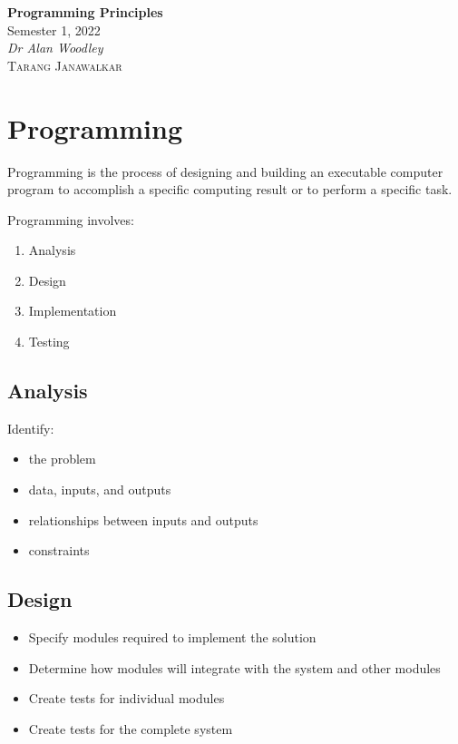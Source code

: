 \documentclass{article}
\date{}
\newcommand{\unitName}{Programming Principles}
\newcommand{\unitTime}{Semester 1, 2022}
\newcommand{\unitCoordinator}{Dr Alan Woodley}
\newcommand{\documentAuthors}{\textsc{Tarang Janawalkar}}
\begin{document}
%
\begin{titlepage}
    \vspace*{\fill}
    \begin{center}
        \LARGE{\textbf{\unitName}} \\[0.1in]
        \normalsize{\unitTime} \\[0.2in]
        \normalsize\textit{\unitCoordinator} \\[0.2in]
        \documentAuthors
    \end{center}
    \vspace*{\fill}
    \doclicenseThis
    \thispagestyle{empty}
\end{titlepage}
\newpage
%
\tableofcontents
\newpage
%
\section{Programming}
\begin{definition}
    Programming is the process of designing and building an executable computer program
    to accomplish a specific computing result or to
    perform a specific task.
\end{definition}
Programming involves:
\begin{enumerate}
    \item Analysis
    \item Design
    \item Implementation
    \item Testing
\end{enumerate}
\subsection{Analysis}
Identify:
\begin{itemize}
    \item the problem
    \item data, inputs, and outputs
    \item relationships between inputs and outputs
    \item constraints
\end{itemize}
\subsection{Design}
\begin{itemize}
    \item Specify modules required to implement the solution
    \item Determine how modules will integrate with the system and
          other modules
    \item Create tests for individual modules
    \item Create tests for the complete system
\end{itemize}
\end{document}

